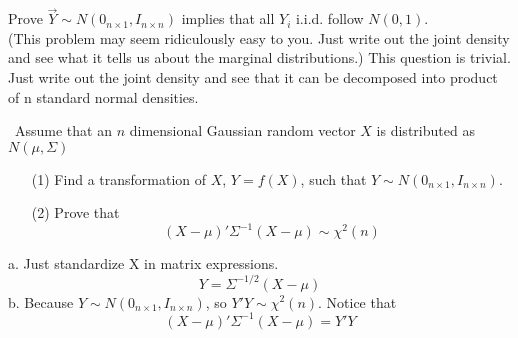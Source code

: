 \documentclass[12pt]{article}
\begin{document}
 {
Prove $\vec{Y}\sim N(0_{n\times1}, I_{n\times n})$ implies that all $Y_i$ i.i.d. follow $N(0,1)$. \\
(This problem may seem ridiculously easy to you. Just write out the joint density and see what it tells us about the marginal distributions.)
} { \vfill
  \answer
} {
This question is trivial. Just write out the joint density and see that it can be decomposed
into product of n standard normal densities.
 }


 {\
Assume that an $n$ dimensional Gaussian random vector $X$ is distributed as $N(\mu,\Sigma)$
\begin{enumerate}
\item[(1)] Find a transformation of $X$, $Y=f(X)$, such that $Y\sim N(0_{n\times 1}, I_{n\times n})$.
\item[(2)] Prove that
\[(X-\mu)'\Sigma^{-1}(X-\mu)\sim \chi^2(n)\]
\end{enumerate}
} { \vfill
  \answer
} {
a. Just standardize X in matrix expressions.
$$Y = \Sigma^{-1/2}(X - \mu)$$
b. Because $Y \sim N(0_{n\times1}, I_{n\times n})$, so $Y'Y \sim \chi^2(n)$. Notice that
$$(X - \mu)'\Sigma^{-1}(X -\mu) = Y'Y $$}



\problemsdone
\end{document}
